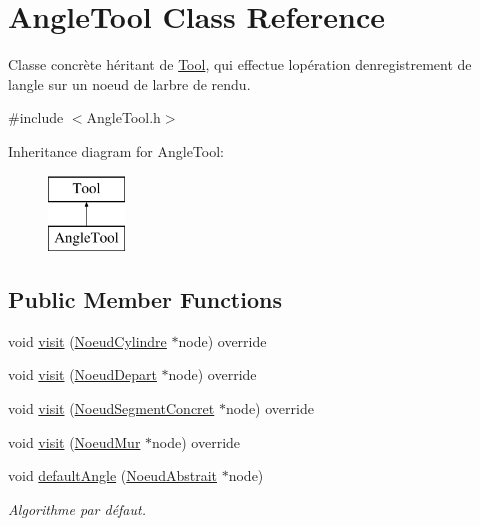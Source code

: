 \hypertarget{class_angle_tool}{}\section{Angle\+Tool Class Reference}
\label{class_angle_tool}


Classe concrète héritant de \hyperlink{class_tool}{Tool}, qui effectue l\textquotesingle{}opération d\textquotesingle{}enregistrement de l\textquotesingle{}angle sur un noeud de l\textquotesingle{}arbre de rendu.  




{\ttfamily \#include $<$Angle\+Tool.\+h$>$}

Inheritance diagram for Angle\+Tool\+:\begin{figure}[H]
\begin{center}
\leavevmode
\includegraphics[height=2.000000cm]{class_angle_tool}
\end{center}
\end{figure}
\subsection*{Public Member Functions}
\begin{DoxyCompactItemize}
\item 
void \hyperlink{group__inf2990_ga925fee2b000babaae1c7947a732a0bba}{visit} (\hyperlink{class_noeud_cylindre}{Noeud\+Cylindre} $\ast$node) override
\item 
void \hyperlink{group__inf2990_gaaa2fc24bde51948c2288c375f19d70ae}{visit} (\hyperlink{class_noeud_depart}{Noeud\+Depart} $\ast$node) override
\item 
void \hyperlink{group__inf2990_ga0209990747f5f623c71076c02a3ed018}{visit} (\hyperlink{class_noeud_segment_concret}{Noeud\+Segment\+Concret} $\ast$node) override
\item 
void \hyperlink{group__inf2990_ga5bf124eb8955a829e87743cc6a737b49}{visit} (\hyperlink{class_noeud_mur}{Noeud\+Mur} $\ast$node) override
\item 
void \hyperlink{group__inf2990_gac864ba35d8073ed9564a0a90d4df351d}{default\+Angle} (\hyperlink{class_noeud_abstrait}{Noeud\+Abstrait} $\ast$node)
\begin{DoxyCompactList}\small\item\em Algorithme par défaut. \end{DoxyCompactList}\end{DoxyCompactItemize}


